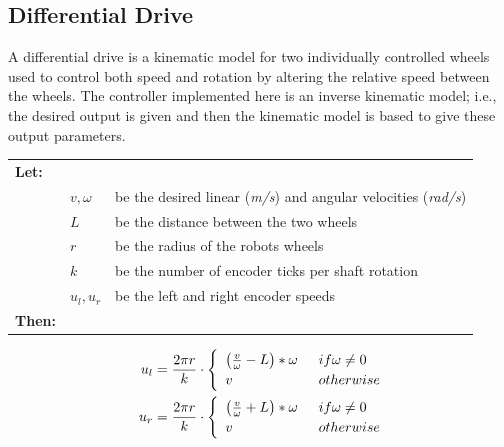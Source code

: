 \documentclass[11pt]{article}
\begin{document}
\subsection{Differential Drive}
A differential drive is a kinematic model for two individually controlled wheels used to control both speed and rotation by altering the relative speed between the wheels. The controller implemented here is an inverse kinematic model; i.e., the desired output is given and then the kinematic model is based to give these output parameters. \par
{\footnotesize
  \begin{tabular}{l l l}
    \textbf{Let:} \\
 &$v, \omega$ & be the desired linear (\emph{m/s}) and angular velocities (\emph{rad/s})\\
 &$L$ &be the distance between the two wheels \\
 &$r$ &be the radius of the robots wheels \\
 &$k$ &be the number of encoder ticks per shaft rotation\\
    &$u_l, u_r$ &be the left and right encoder speeds \\
    \textbf{Then:}
  \end{tabular}
  \begin{align}
    u_l &=  \frac{2\pi r}{k} \cdot \begin{cases}
                    \hspace{5pt}\left(\frac{v}{\omega} - L \right) * \omega \hspace{5pt} & if \omega \neq 0\\
                    \hspace{5pt} v & otherwise
                  \end{cases} \vspace{5pt} \\
    u_r &=  \frac{2\pi r}{k} \cdot \begin{cases}
                    \hspace{5pt}\left(\frac{v}{\omega} + L \right) * \omega \hspace{5pt} & if \omega \neq 0\\
                    \hspace{5pt}v & otherwise
                  \end{cases} 
  \end{align}}
\end{document}
